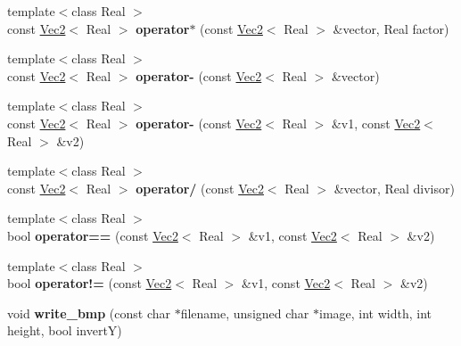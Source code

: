 \begin{DoxyCompactItemize}
\item 
\hypertarget{namespacehokusai_aa524b14ad12a60c8fba5d961709a80d7}{{\footnotesize template$<$class Real $>$ }\\const \hyperlink{classhokusai_1_1Vec2}{Vec2}$<$ Real $>$ {\bfseries operator$\ast$} (const \hyperlink{classhokusai_1_1Vec2}{Vec2}$<$ Real $>$ \&vector, Real factor)}\label{namespacehokusai_aa524b14ad12a60c8fba5d961709a80d7}

\item 
\hypertarget{namespacehokusai_ad148921f15feb4413e24f4b2fc64c7e0}{{\footnotesize template$<$class Real $>$ }\\const \hyperlink{classhokusai_1_1Vec2}{Vec2}$<$ Real $>$ {\bfseries operator-\/} (const \hyperlink{classhokusai_1_1Vec2}{Vec2}$<$ Real $>$ \&vector)}\label{namespacehokusai_ad148921f15feb4413e24f4b2fc64c7e0}

\item 
\hypertarget{namespacehokusai_a07ad760b7b6b8a7cbdf83bd224aaee44}{{\footnotesize template$<$class Real $>$ }\\const \hyperlink{classhokusai_1_1Vec2}{Vec2}$<$ Real $>$ {\bfseries operator-\/} (const \hyperlink{classhokusai_1_1Vec2}{Vec2}$<$ Real $>$ \&v1, const \hyperlink{classhokusai_1_1Vec2}{Vec2}$<$ Real $>$ \&v2)}\label{namespacehokusai_a07ad760b7b6b8a7cbdf83bd224aaee44}

\item 
\hypertarget{namespacehokusai_a9b280f7db92643b0cae349566c7c237c}{{\footnotesize template$<$class Real $>$ }\\const \hyperlink{classhokusai_1_1Vec2}{Vec2}$<$ Real $>$ {\bfseries operator/} (const \hyperlink{classhokusai_1_1Vec2}{Vec2}$<$ Real $>$ \&vector, Real divisor)}\label{namespacehokusai_a9b280f7db92643b0cae349566c7c237c}

\item 
\hypertarget{namespacehokusai_af57aff6793cdf59738346194d475357d}{{\footnotesize template$<$class Real $>$ }\\bool {\bfseries operator==} (const \hyperlink{classhokusai_1_1Vec2}{Vec2}$<$ Real $>$ \&v1, const \hyperlink{classhokusai_1_1Vec2}{Vec2}$<$ Real $>$ \&v2)}\label{namespacehokusai_af57aff6793cdf59738346194d475357d}

\item 
\hypertarget{namespacehokusai_afe4c02a8228438561d5cbe9eda0258d8}{{\footnotesize template$<$class Real $>$ }\\bool {\bfseries operator!=} (const \hyperlink{classhokusai_1_1Vec2}{Vec2}$<$ Real $>$ \&v1, const \hyperlink{classhokusai_1_1Vec2}{Vec2}$<$ Real $>$ \&v2)}\label{namespacehokusai_afe4c02a8228438561d5cbe9eda0258d8}

\item 
\hypertarget{namespacehokusai_a47488aadd314212983f77ea5b4d05726}{void {\bfseries write\+\_\+bmp} (const char $\ast$filename, unsigned char $\ast$image, int width, int height, bool invert\+Y)}\label{namespacehokusai_a47488aadd314212983f77ea5b4d05726}

\end{DoxyCompactItemize}


